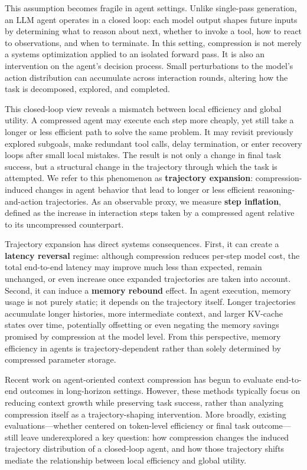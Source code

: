 \documentclass{article}
\begin{document}
This assumption becomes fragile in agent settings. Unlike single-pass generation, an LLM agent operates in a closed loop: each model output shapes future inputs by determining what to reason about next, whether to invoke a tool, how to react to observations, and when to terminate. In this setting, compression is not merely a systems optimization applied to an isolated forward pass. It is also an intervention on the agent's decision process. Small perturbations to the model's action distribution can accumulate across interaction rounds, altering how the task is decomposed, explored, and completed.

This closed-loop view reveals a mismatch between local efficiency and global utility. A compressed agent may execute each step more cheaply, yet still take a longer or less efficient path to solve the same problem. It may revisit previously explored subgoals, make redundant tool calls, delay termination, or enter recovery loops after small local mistakes. The result is not only a change in final task success, but a structural change in the trajectory through which the task is attempted. We refer to this phenomenon as \textbf{trajectory expansion}: compression-induced changes in agent behavior that lead to longer or less efficient reasoning-and-action trajectories. As an observable proxy, we measure \textbf{step inflation}, defined as the increase in interaction steps taken by a compressed agent relative to its uncompressed counterpart.

Trajectory expansion has direct systems consequences. First, it can create a \textbf{latency reversal} regime: although compression reduces per-step model cost, the total end-to-end latency may improve much less than expected, remain unchanged, or even increase once expanded trajectories are taken into account. Second, it can induce a \textbf{memory rebound} effect. In agent execution, memory usage is not purely static; it depends on the trajectory itself. Longer trajectories accumulate longer histories, more intermediate context, and larger KV-cache states over time, potentially offsetting or even negating the memory savings promised by compression at the model level. From this perspective, memory efficiency in agents is trajectory-dependent rather than solely determined by compressed parameter storage.

Recent work on agent-oriented context compression has begun to evaluate end-to-end outcomes in long-horizon settings. However, these methods typically focus on reducing context growth while preserving task success, rather than analyzing compression itself as a trajectory-shaping intervention. More broadly, existing evaluations---whether centered on token-level efficiency or final task outcome---still leave underexplored a key question: how compression changes the induced trajectory distribution of a closed-loop agent, and how those trajectory shifts mediate the relationship between local efficiency and global utility.
\end{document}
